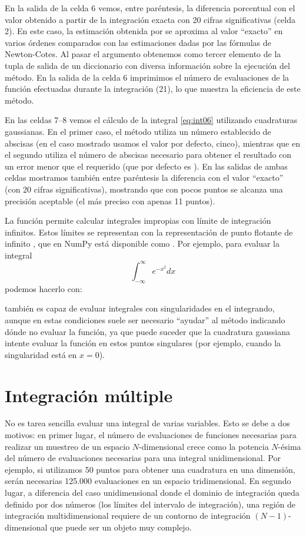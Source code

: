 En la salida de la celda 6 vemos, entre paréntesis, la diferencia porcentual con el valor obtenido a partir de la integración exacta con 20 cifras significativas (celda 2). En este caso, la estimación obtenida por  se aproxima al valor ``exacto'' en varios órdenes comparados con las estimaciones dadas por las fórmulas de Newton-Cotes. Al pasar el argumento  obtenemos como tercer elemento de la tupla de salida de  un diccionario con diversa información sobre la ejecución del método. En la salida de la celda 6 imprimimos el número de evaluaciones de la función  efectuadas durante la integración (21), lo que muestra la eficiencia de este método.

En las celdas 7--8 vemos el cálculo de la integral \eqref{eq:int06} utilizando cuadraturas gaussianas. En el primer caso, el método  utiliza un número establecido de abscisas (en el caso mostrado usamos el valor por defecto, cinco), mientras que en el segundo  utiliza el número de abscisas necesario para obtener el resultado con un error menor que el requerido (que por defecto es ). En las salidas de ambas celdas mostramos también entre paréntesis la diferencia con el valor ``exacto'' (con 20 cifras significativas), mostrando que con pocos puntos se alcanza una precisión aceptable (el más preciso con apenas 11 puntos).

La función  permite calcular integrales impropias con límite de integración infinitos. Estos límites se representan con la representación de punto flotante de infinito , que en NumPy está disponible como . Por ejemplo, para evaluar la integral
\[ \int_{-\infty}^{\infty} e^{-x^2} dx \]
podemos hacerlo con:

 también es capaz de evaluar integrales con singularidades en el integrando, aunque en estas condiciones suele ser necesario ``ayudar'' al método indicando dónde no evaluar la función, ya que puede suceder que la cuadratura gaussiana intente evaluar la función en estos puntos singulares (por ejemplo, cuando la singularidad está en $x = 0$).


\section{Integración múltiple}\label{sec:int-multiple}
No es tarea sencilla evaluar una integral de varias variables. Esto se debe a dos motivos: en primer lugar, el número de evaluaciones de funciones necesarias para realizar un muestreo de un espacio $N$-dimensional crece como la potencia $N$-ésima del número de evaluaciones necesarias para una integral unidimensional. Por ejemplo, si utilizamos 50 puntos para obtener una cuadratura en una dimensión, serán necesarias 125.000 evaluaciones en un espacio tridimensional. En segundo lugar, a diferencia del caso unidimensional donde el dominio de integración queda definido por dos números (los límites del intervalo de integración), una región de integración multidimensional requiere de un contorno de integración $(N-1)$-dimensional que puede ser un objeto muy complejo.


